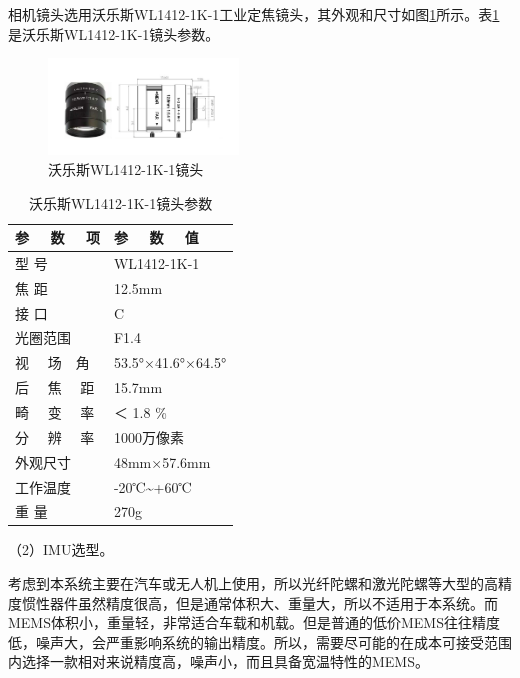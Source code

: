 相机镜头选用沃乐斯WL1412-1K-1工业定焦镜头，其外观和尺寸如图\ref{fig2_9}所示。表\ref{tab2.2}是沃乐斯WL1412-1K-1镜头参数。
\begin{figure}[!h]\setlength{\belowcaptionskip}{8pt}
	\centering
	\includegraphics[width=0.45\textwidth]{figures/chapter2/fig2_9}
	\caption{沃乐斯WL1412-1K-1镜头}\label{fig2_9}
\end{figure}
\begin{table}[!h]\setlength{\belowcaptionskip}{-12pt}
	\centering
	\caption{沃乐斯WL1412-1K-1镜头参数} \label{tab2.2}
	\begin{tabular}{m{}<{\centering} m{}<{\centering}}%
		\toprule
		参 \ \  数 \ \  项                   &参 \ \  数 \ \  值       \\
		\midrule
		型 \quad\quad 号			&WL1412-1K-1	 \\
		焦 \quad\quad 距	       &12.5mm         \\
		接 \quad\quad 口	    	&C	         \\
		光圈范围	              &F1.4	 \\
		视 \ \  场\ \  角	              &53.5°×41.6°×64.5°      \\
		后 \ \  焦 \ \  距                  &15.7mm           \\
		畸 \ \  变 \ \  率                  &＜ 1.8 \% \\
		分 \ \  辨 \ \  率                  &1000万像素 \\
		外观尺寸                  &48mm×57.6mm\\
		工作温度                  &-20℃\textasciitilde +60℃               \\
		重 \quad\quad 量                  &270g                \\
		\bottomrule
	\end{tabular}
\end{table}

（2）IMU选型。

考虑到本系统主要在汽车或无人机上使用，所以光纤陀螺和激光陀螺等大型的高精度惯性器件虽然精度很高，但是通常体积大、重量大，所以不适用于本系统。而MEMS体积小，重量轻，非常适合车载和机载。但是普通的低价MEMS往往精度低，噪声大，会严重影响系统的输出精度。所以，需要尽可能的在成本可接受范围内选择一款相对来说精度高，噪声小，而且具备宽温特性的MEMS。

